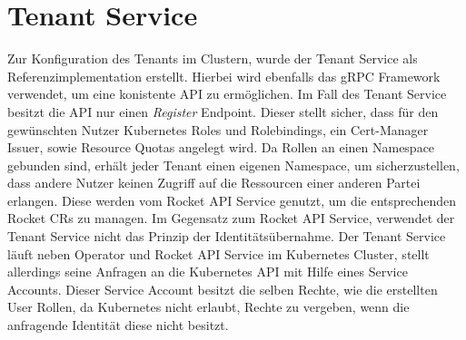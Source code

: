 \section{Tenant Service}
\label{sec:komponenten:tenant-service}
Zur Konfiguration des Tenants im Clustern, wurde der Tenant Service als Referenzimplementation erstellt. Hierbei
wird ebenfalls das gRPC Framework verwendet, um eine konistente API zu ermöglichen. Im Fall des Tenant Service
besitzt die API nur einen \emph{Register} Endpoint. Dieser stellt sicher, dass für den gewünschten Nutzer 
Kubernetes Roles und Rolebindings, ein Cert-Manager Issuer, sowie Resource Quotas angelegt wird. 
Da Rollen an einen Namespace gebunden sind, erhält jeder Tenant einen eigenen Namespace, um sicherzustellen,
dass andere Nutzer keinen Zugriff auf die Ressourcen einer anderen Partei erlangen.
Diese werden vom Rocket API Service genutzt, um die entsprechenden Rocket \acp{CR} zu managen. 
Im Gegensatz zum Rocket API Service, verwendet der Tenant Service nicht das Prinzip der Identitätsübernahme.
Der Tenant Service läuft neben Operator und Rocket API Service im Kubernetes Cluster, stellt allerdings seine
Anfragen an die Kubernetes API mit Hilfe eines Service Accounts. Dieser Service Account besitzt die selben Rechte,
wie die erstellten User Rollen, da Kubernetes nicht erlaubt, Rechte zu vergeben, wenn die anfragende Identität
diese nicht besitzt.